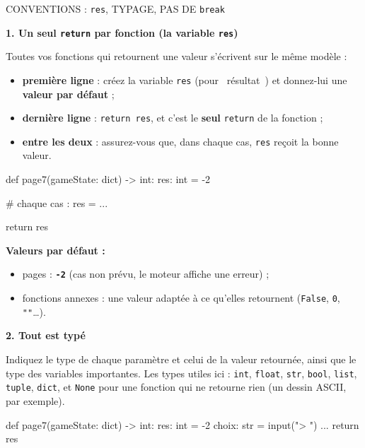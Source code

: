 \documentclass[11pt,a4paper]{article}
\newcommand{\guil}[1]{\guillemotleft~#1~\guillemotright}
\begin{document}
\begin{convention}{CONVENTIONS : \texttt{res}, TYPAGE, PAS DE \texttt{break}}
\raggedright
\textbf{\color{magenta}1. Un seul \texttt{return} par fonction (la variable \texttt{res})}

Toutes vos fonctions qui retournent une valeur s'écrivent sur le même modèle :
\begin{itemize}[leftmargin=1.4em]
  \item \textbf{première ligne} : créez la variable \texttt{res} (pour \guil{résultat}) et
        donnez-lui une \textbf{valeur par défaut} ;
  \item \textbf{dernière ligne} : \texttt{return res}, et c'est le \textbf{seul}
        \texttt{return} de la fonction ;
  \item \textbf{entre les deux} : assurez-vous que, dans chaque cas, \texttt{res} reçoit
        la bonne valeur.
\end{itemize}

\begin{minipage}[t]{0.50\linewidth}
\begin{code}
def page7(gameState: dict) -> int:
    res: int = -2

    # chaque cas : res = ...

    return res
\end{code}
\end{minipage}\hfill
\begin{minipage}[t]{0.46\linewidth}\raggedright
\textbf{Valeurs par défaut :}
\begin{itemize}[leftmargin=1.2em]
  \item pages : \textbf{\texttt{-2}} (cas non prévu, le moteur affiche une erreur) ;
  \item fonctions annexes : une valeur adaptée à ce qu'elles retournent
        (\texttt{False}, \texttt{0}, \texttt{""}\dots).
\end{itemize}
\end{minipage}

\medskip
\textbf{\color{magenta}2. Tout est typé}

Indiquez le type de chaque paramètre et celui de la valeur retournée, ainsi que le type
des variables importantes. Les types utiles ici : \texttt{int}, \texttt{float},
\texttt{str}, \texttt{bool}, \texttt{list}, \texttt{tuple}, \texttt{dict}, et
\texttt{None} pour une fonction qui ne retourne rien (un dessin ASCII, par exemple).

\begin{code}
def page7(gameState: dict) -> int:
    res: int = -2
    choix: str = input("> ")
    ...
    return res
\end{code}


\end{convention}
\end{document}
